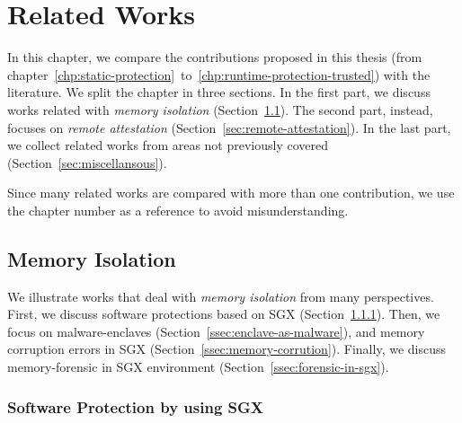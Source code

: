 \chapter{Related Works}
\label{chp:related-works}

In this chapter, we compare the contributions proposed in this thesis (from 
chapter~\ref{chp:static-protection}~to~\ref{chp:runtime-protection-trusted}) 
with the literature.
We split the chapter in three sections. 
In the first part, we discuss works related with \emph{memory isolation} 
(Section~\ref{sec:memory-isolation}).
The second part, instead, focuses on \emph{remote attestation} 
(Section~\ref{sec:remote-attestation}).
In the last part, we collect related works from areas not previously covered 
(Section~\ref{sec:miscellansous}).

Since many related works are compared with more than one contribution, we use 
the chapter number as a reference to avoid misunderstanding.

\section{Memory Isolation}
\label{sec:memory-isolation}

We illustrate works that deal with \emph{memory isolation} from many 
perspectives.
First, we discuss software protections based on SGX 
(Section~\ref{ssec:software-protection-by-using-sgx}).
Then, we focus on malware-enclaves (Section~\ref{ssec:enclave-as-malware}), and
memory corruption errors in SGX (Section~\ref{ssec:memory-corrution}).
Finally, we discuss memory-forensic in SGX environment 
(Section~\ref{ssec:forensic-in-sgx}).

\subsection{Software Protection by using SGX}
\label{ssec:software-protection-by-using-sgx}

